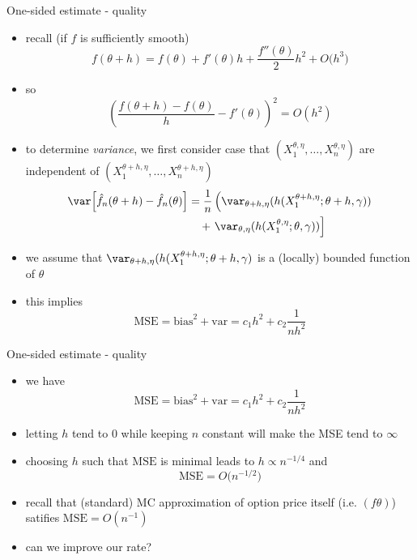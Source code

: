 \documentclass[pdf, handout]{beamer}
\begin{document}
\begin{frame}{One-sided estimate - quality}
\begin{itemize}
\item recall (if $f$ is sufficiently smooth)
\[
f(\theta+h) = f(\theta) + f'(\theta)h+\frac{f''(\theta)}{2}h^2 +O\big(h^3\big)
\]
\item so 
\[
\left( \frac{f(\theta+h)-f(\theta)}{h} 
-f'(\theta) \right)^2 = O(h^2)
\]
\item to determine  \emph{variance}, we first consider case  that
$(X_1^{\theta,\eta},\dots,X_n^{\theta,\eta})$ are independent of
$(X_1^{\theta+h,\eta},\dots,X_n^{\theta+h,\eta})$
\begin{align*}
 \var\!\left[
  \hat f_n(\theta+h) -  \hat f_n(\theta)
\right]
 &= \frac{1}{n} \left( \var_{\theta+h,\eta}(   
h(X_1^{\theta+h,\eta};\theta+h,\gamma))
 \right. \\
&\quad +\left.\var_{\theta,\eta}(   
h(X_1^{\theta,\eta};\theta,\gamma))\right]
\end{align*}
\item we assume that $ \var_{\theta+h,\eta}(   
h(X_1^{\theta+h,\eta};\theta+h,\gamma)$ is a (locally) bounded function of $\theta$
\item this implies
\[
\text{MSE}  = \text{bias}^2 + \text{var}= c_1 h^2  + c_2 \frac{1}{nh^2}
\]
\end{itemize}
\end{frame}

\begin{frame}{One-sided estimate - quality}
\begin{itemize}
\item we have
\[
\text{MSE}  = \text{bias}^2 + \text{var}= c_1 h^2  + c_2 \frac{1}{nh^2}
\]
\item letting $h$ tend to $0$ while keeping $n$ constant will make the MSE
tend to $\infty$
\item choosing $h$ such that $\text{MSE}$ is minimal 
leads to $h \propto n^{-1/4}$ and
$$
\text{MSE} = O\big(n^{-1/2}\big)
$$
\item recall that (standard) MC approximation of option price itself (i.e. $(f\theta)$) satifies
$\text{MSE} = O(n^{-1})$
\item can we improve our rate?
\end{itemize}
\end{frame}
\end{document}

